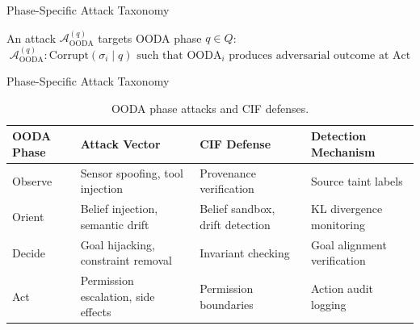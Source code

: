 \documentclass[
  ignorenonframetext,
]{beamer}
\begin{document}
\begin{frame}[allowframebreaks]{Phase-Specific Attack Taxonomy}
\protect{}\label{phase-specific-attack-taxonomy}
\begin{definition}
\label{def:ooda-phase-attack}
An attack $\mathcal{A}_{\text{OODA}}^{(q)}$ targets OODA phase $q \in Q$:
\begin{equation}
\label{eq:ooda-attack}
\mathcal{A}_{\text{OODA}}^{(q)}: \text{Corrupt}(\sigma_i \mid q) \text{ such that } \text{OODA}_i \text{ produces adversarial outcome at } \text{Act}
\end{equation}
\end{definition}

\end{frame}

\begin{frame}[allowframebreaks]{Phase-Specific Attack Taxonomy}
\begin{table}[htbp]
\centering
\caption{OODA phase attacks and CIF defenses.}
\label{tab:ooda-attacks}
\begin{tabular}{@{}lp{4cm}p{4cm}l@{}}
\toprule
OODA Phase & Attack Vector & CIF Defense & Detection Mechanism \\
\midrule
Observe & Sensor spoofing, tool injection & Provenance verification & Source taint labels \\
Orient & Belief injection, semantic drift & Belief sandbox, drift detection & KL divergence monitoring \\
Decide & Goal hijacking, constraint removal & Invariant checking & Goal alignment verification \\
Act & Permission escalation, side effects & Permission boundaries & Action audit logging \\
\bottomrule
\end{tabular}
\end{table}
\end{frame}
\end{document}
